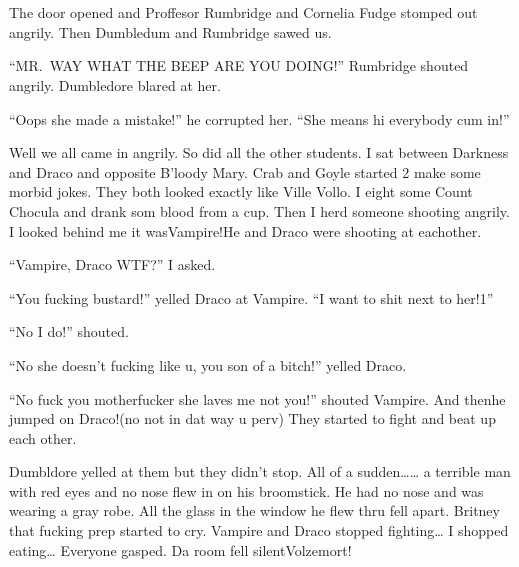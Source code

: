 \section{}



\begin{sloppypar}
    The door opened and Proffesor Rumbridge and Cornelia Fudge stomped out angrily. Then Dumbledum and Rumbridge sawed us.
\end{sloppypar}

\enquote{MR.~WAY WHAT THE BEEP ARE YOU DOING\@!} Rumbridge shouted angrily. Dumbledore blared at her.

\enquote{Oops she made a mistake!} he corrupted her. \enquote{She means hi everybody cum in!}

Well we all came in angrily. So did all the other students. I sat between Darkness and Draco and opposite B'loody Mary. Crab and Goyle started 2 make some morbid jokes. They both looked exactly like Ville Vollo. I eight some Count Chocula and drank som blood from a cup. Then I herd someone shooting angrily. I looked behind me it was\dotfill Vampire!\newline He and Draco were shooting at eachother.

\enquote{Vampire, Draco WTF?} I asked.

\enquote{You fucking bustard!} yelled Draco at Vampire. \enquote{I want to shit next to her!1}

\enquote{No I do!} shouted.

\enquote{No she doesn't fucking like u, you son of a bitch!} yelled Draco.

\enquote{No fuck you motherfucker she laves me not you!} shouted Vampire. And then\dotfill he jumped on Draco!\newline (no not in dat way u perv) They started to fight and beat up each other.

Dumbldore yelled at them but they didn't stop. All of a sudden\ldots{}\ldots{} a terrible man with red eyes and no nose flew in on his broomstick. He had no nose and was wearing a gray robe. All the glass in the window he flew thru fell apart. Britney that fucking prep started to cry. Vampire and Draco stopped fighting\ldots{} I shopped eating\ldots{} Everyone gasped. Da room fell silent\dotfill\newline\phantom{}\dotfill Volzemort!

